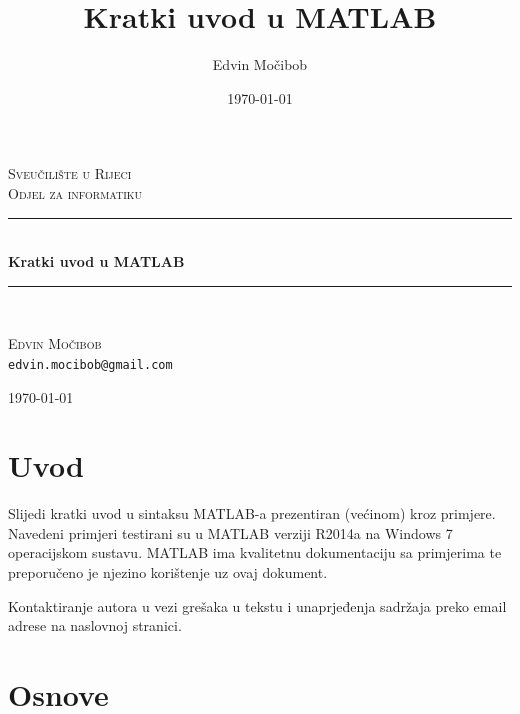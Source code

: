 \documentclass[a4paper, 10pt]{article}
\title{Kratki uvod u MATLAB}
\author{Edvin Močibob}
\date{\today}
\begin{document}

\begin{titlepage}
\newcommand{\HRule}{\rule{\linewidth}{0.5mm}}
\begin{center}

\textsc{\LARGE Sveučilište u Rijeci}\\[0.5cm]
\textsc{\Large Odjel za informatiku}\\[2.5cm]

\HRule \\[0.4cm]
{\huge \bfseries Kratki uvod u MATLAB}\\[0.1cm]

\HRule \\[1.5cm]

\begin{minipage}{0.5\textwidth}
	\begin{center}
		\large
		\textsc{\Large Edvin Močibob}\\[0.1cm]
		\texttt{edvin.mocibob@gmail.com}
	\end{center}
\end{minipage}

\vfill
{\large \today}
\end{center}
\end{titlepage}

\newpage\null\thispagestyle{empty}\addtocounter{page}{-1}\newpage %

\tableofcontents
\clearpage

\section*{Uvod}

Slijedi kratki uvod u sintaksu MATLAB-a prezentiran (većinom) kroz primjere. Navedeni primjeri testirani su u MATLAB verziji R2014a na Windows 7 operacijskom sustavu. MATLAB ima kvalitetnu dokumentaciju sa primjerima te preporučeno je njezino korištenje uz ovaj dokument.

Kontaktiranje autora u vezi grešaka u tekstu i unaprjeđenja sadržaja preko email adrese na naslovnoj stranici.

\clearpage

\section{Osnove}
\end{document}
